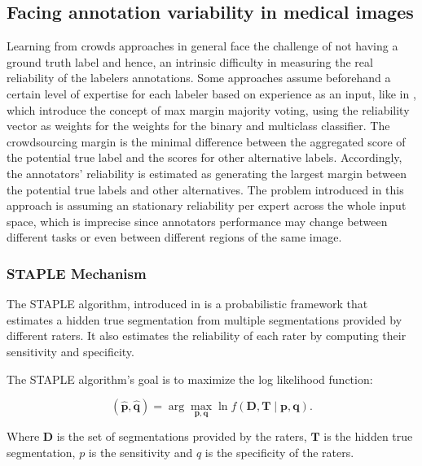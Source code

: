 \subsection{Facing annotation variability in medical
images}\label{subsec:expertise_levels_lit_review}

Learning from crowds approaches in general face the challenge of
not having a ground truth label and hence, an intrinsic difficulty in
measuring the real reliability of the labelers annotations. Some
approaches assume beforehand a certain level of expertise for each
labeler based on experience as an input, like in
\cite{TianEtZhu2015}, which introduce the concept of max margin
majority voting, using the reliability vector as weights for the
weights for the binary and multiclass classifier. The crowdsourcing
margin is the minimal difference between the aggregated score of the
potential true label and the scores for other alternative labels.
Accordingly, the annotators' reliability is estimated as generating
the largest margin between the potential true labels and other
alternatives. The problem introduced in this approach is assuming an
stationary reliability per expert across the whole input space, which
is imprecise since annotators performance may change between
different tasks or even between different regions of the same image.

\subsubsection{STAPLE Mechanism}

The \gls{STAPLE} algorithm, introduced in \cite{WarfieldEtAl2004}
is a probabilistic framework that estimates a hidden true
segmentation from multiple segmentations provided by
different raters. It also estimates the reliability of each rater by
computing their sensitivity and specificity.

The \gls{STAPLE} algorithm's goal is to maximize the log likelihood function:

\begin{equation}\label{eq:staple_likelilhood}
  (\mathbf{\hat{p}}, \mathbf{\hat{q}}) = \arg\max_{\mathbf{p}, \mathbf{q}} \ln
  f(\mathbf{D},
  \mathbf{T} \mid \mathbf{p}, \mathbf{q}).
\end{equation}

Where $\mathbf{D}$ is the set of segmentations provided by the raters,
$\mathbf{T}$ is the hidden true segmentation, $p$ is the sensitivity
and $q$ is the specificity of the raters.

